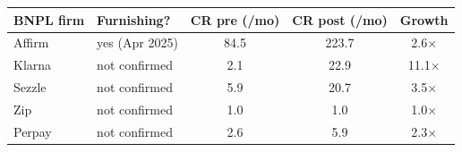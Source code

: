 \begin{tabular}{llccc}
\toprule
BNPL firm & Furnishing? & CR pre (/mo) & CR post (/mo) & Growth \\
\midrule
Affirm & yes (Apr 2025) & 84.5 & 223.7 & 2.6$\times$ \\
Klarna & not confirmed & 2.1 & 22.9 & 11.1$\times$ \\
Sezzle & not confirmed & 5.9 & 20.7 & 3.5$\times$ \\
Zip & not confirmed & 1.0 & 1.0 & 1.0$\times$ \\
Perpay & not confirmed & 2.6 & 5.9 & 2.3$\times$ \\
\bottomrule
\end{tabular}